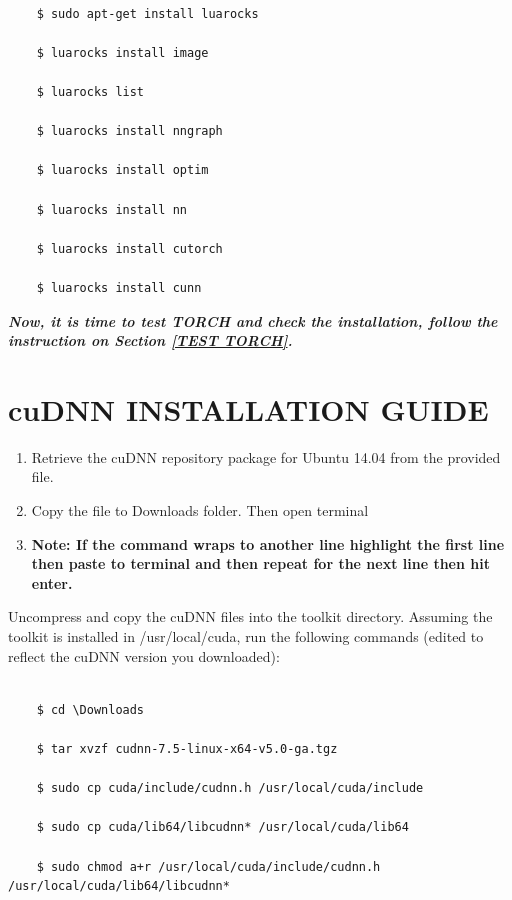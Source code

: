 \documentclass[12pt]{article}
\begin{document}
\begin{lstlisting}

    $ sudo apt-get install luarocks

    $ luarocks install image

    $ luarocks list

    $ luarocks install nngraph

    $ luarocks install optim

    $ luarocks install nn

    $ luarocks install cutorch

    $ luarocks install cunn

\end{lstlisting}

\textbf{\emph{Now, it is time to test TORCH and check the installation, follow the instruction on Section \ref{TEST TORCH}.}}

\newpage
\section{cuDNN INSTALLATION GUIDE}

\begin{enumerate}
  \item Retrieve the cuDNN repository package for Ubuntu 14.04 from the provided file.
  \item Copy the file to Downloads folder. Then open terminal
  \item \textbf{Note: If the command wraps to another line highlight the first line then paste to terminal and then repeat for the next line then hit enter.}
\end{enumerate}

Uncompress and copy the cuDNN files into the toolkit directory. Assuming the toolkit is installed in /usr/local/cuda, run the following commands (edited to reflect the cuDNN version you downloaded)\cite{cuDNN}:

\begin{lstlisting}

    $ cd \Downloads

    $ tar xvzf cudnn-7.5-linux-x64-v5.0-ga.tgz

    $ sudo cp cuda/include/cudnn.h /usr/local/cuda/include

    $ sudo cp cuda/lib64/libcudnn* /usr/local/cuda/lib64

    $ sudo chmod a+r /usr/local/cuda/include/cudnn.h /usr/local/cuda/lib64/libcudnn*

\end{lstlisting}
\end{document}
